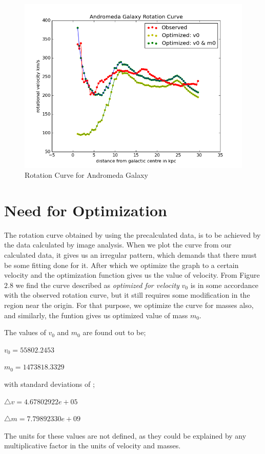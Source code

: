 \begin{figure} [h]
\centering
\includegraphics[scale=0.5]{best}
\caption{Rotation Curve for Andromeda Galaxy}
\end{figure}

\section{Need for Optimization}

The rotation curve obtained by using the precalculated data, is to be achieved by the data calculated by image analysis. When we plot the curve from our calculated data, it gives us an irregular pattern, which demands that there must be some fitting done for it. After which we optimize the graph to a certain velocity and the optimization function gives us the value of velocity. From Figure $2.8$ we find the curve described as \textit{optimized for velocity} \textbf{$v_{0}$} is in some accordance with the observed rotation curve, but it still requires some modification in the region near the origin. For that purpose, we optimize the curve for masses also, and similarly, the funtion gives us optimized value of mass \textbf{$m_{0}$}. 

The values of $v_{0}$ and $m_{0}$ are found out to be;

$v_{0} = 55802.2453 $         

$m_{0} = 1473818.3329 $

with standard deviations of ;

$\triangle v =  4.67802922e+05$

$\triangle m = 7.79892330e+09 $

The units for these values are not defined, as they could be explained by any multiplicative factor in the units of velocity and masses. 